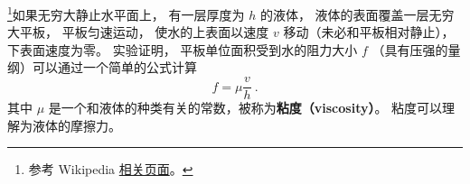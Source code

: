 
\begin{issues}
\issueDraft
\end{issues}

\footnote{参考 Wikipedia \href{https://en.wikipedia.org/wiki/Viscosity}{相关页面}。}如果无穷大静止水平面上， 有一层厚度为 $h$ 的液体， 液体的表面覆盖一层无穷大平板， 平板匀速运动， 使水的上表面以速度 $v$ 移动（未必和平板相对静止）， 下表面速度为零。 实验证明， 平板单位面积受到水的阻力大小 $f$ （具有压强的量纲）可以通过一个简单的公式计算
\begin{equation}
f = \mu \frac{v}{h}~.
\end{equation}
其中 $\mu$ 是一个和液体的种类有关的常数，被称为\textbf{粘度（viscosity）}。 粘度可以理解为液体的摩擦力。
